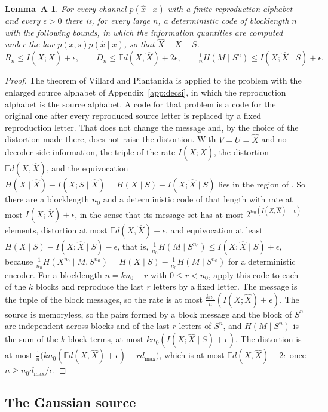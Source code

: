 \documentclass[11pt,onecolumn]{IEEEtran}
\newtheorem*{lemmaA}{Lemma~A}
\newcommand{\E}{\mathbb{E}}
\newcommand{\hX}{\widehat{X}}
\begin{document}
\begin{lemmaA}
For every channel $p(\hat x\mid x)$ with a finite reproduction alphabet
and every $\epsilon>0$ there is, for every large $n$, a deterministic
code of blocklength $n$ with the following bounds, in which the
information quantities are computed under the law
$p(x,s)p(\hat x\mid x)$, so that $\hX-X-S$.
\[
R_n\le I(X;\hX)+\epsilon,\qquad
D_n\le\E d(X,\hX)+2\epsilon,\qquad
\tfrac1nH(M\mid S^n)\le I(X;\hX\mid S)+\epsilon .
\]
\end{lemmaA}

\begin{proof}
The theorem of Villard and Piantanida is applied to the problem with
the enlarged source alphabet of Appendix~\ref{app:decsi}, in which the
reproduction alphabet is the source alphabet. A code for that problem
is a code for the original one after every reproduced source letter is
replaced by a fixed reproduction letter. That does not change the
message and, by the choice of the distortion made there, does not
raise the distortion. With $V=U=\hX$ and no decoder side information, the triple of the rate
$I(X;\hX)$, the distortion $\E d(X,\hX)$, and the equivocation
$H(X\mid\hX)-I(X;S\mid\hX)=H(X\mid S)-I(X;\hX\mid S)$ lies in the region
of \cite[Theorem~3]{villard2013}. So there are a blocklength $n_0$ and a
deterministic code of that length with rate at most
$I(X;\hX)+\epsilon$, in the sense that its message set has at most
$2^{n_0(I(X;\hX)+\epsilon)}$ elements, distortion at most $\E d(X,\hX)+\epsilon$, and
equivocation at least $H(X\mid S)-I(X;\hX\mid S)-\epsilon$, that is,
$\tfrac1{n_0}H(M\mid S^{n_0})\le I(X;\hX\mid S)+\epsilon$, because
$\tfrac1{n_0}H(X^{n_0}\mid M,S^{n_0})=H(X\mid S)-\tfrac1{n_0}H(M\mid S^{n_0})$
for a deterministic encoder. For a blocklength $n=kn_0+r$ with
$0\le r<n_0$, apply this code to each of the $k$ blocks and reproduce
the last $r$ letters by a fixed letter. The message is the tuple of the
block messages, so the rate is at most $\tfrac{kn_0}n(I(X;\hX)+\epsilon)$.
The source is memoryless, so the pairs formed by a block message and
the block of $S^n$ are independent across blocks and of the last $r$
letters of $S^n$, and
$H(M\mid S^n)$ is the sum of the $k$ block terms, at most
$kn_0(I(X;\hX\mid S)+\epsilon)$. The distortion is at most
$\tfrac1n\bigl(kn_0(\E d(X,\hX)+\epsilon)+rd_{\max}\bigr)$, which is at
most $\E d(X,\hX)+2\epsilon$ once $n\ge n_0d_{\max}/\epsilon$.
\end{proof}

\subsection{The Gaussian source}
\end{document}
